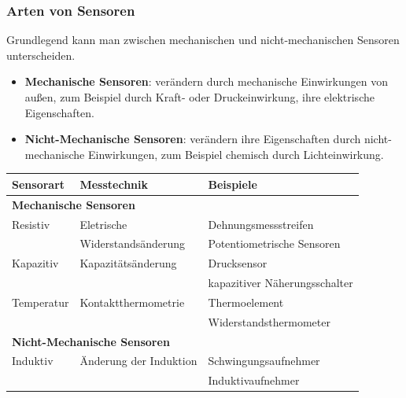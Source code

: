 \begin{flushleft}
	        \subsubsection{Arten von Sensoren \cite{TS_sensor_aufteilen}}
	
	        Grundlegend kann man zwischen mechanischen und nicht-mechanischen Sensoren unterscheiden. \\
	        \begin{itemize}
	            \item \textbf{Mechanische Sensoren}: verändern durch mechanische Einwirkungen von außen, zum Beispiel durch Kraft- oder Druckeinwirkung, ihre elektrische Eigenschaften.
	            \item \textbf{Nicht-Mechanische Sensoren}: verändern ihre Eigenschaften durch nicht-mechanische Einwirkungen, zum Beispiel chemisch durch Lichteinwirkung.
	        \end{itemize}
	        \begin{table}[h]
	        \begin{tabularx}{\textwidth}{l|l|l}
	
	                    \textbf{Sensorart} & \textbf{Messtechnik} & \textbf{Beispiele}\\
						\hline
	                    \multicolumn{3}{l}{\textbf{Mechanische Sensoren}}\\
	                    \hline
						Resistiv & Eletrische & Dehnungsmessstreifen \\
						&Widerstandsänderung& Potentiometrische Sensoren\\
						\hline
	                    
	                    Kapazitiv & Kapazitätsänderung & Drucksensor\\
	                    && kapazitiver Näherungsschalter \\
						\hline
						
						Temperatur & Kontaktthermometrie & Thermoelement\\
						&& Widerstandsthermometer \\
	                    \hline
	
	                    \multicolumn{3}{l}{\textbf{Nicht-Mechanische Sensoren}}\\
	                    \hline
	
	                    Induktiv & Änderung der Induktion & Schwingungsaufnehmer \\
	                    && Induktivaufnehmer\\
	                    \hline
									

\end{tabularx}
\end{table}
\end{flushleft}
